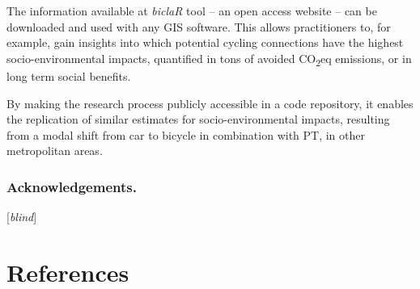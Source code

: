 \documentclass[review, doubleblind, 3p,
authoryear]{elsarticle} %
\begin{document}
The information available at \emph{biclaR} tool -- an open access
website -- can be downloaded and used with any GIS software. This allows
practitioners to, for example, gain insights into which potential
cycling connections have the highest socio-environmental impacts,
quantified in tons of avoided CO\textsubscript{2}eq emissions, or in
long term social benefits.

By making the research process publicly accessible in a code repository,
it enables the replication of similar estimates for socio-environmental
impacts, resulting from a modal shift from car to bicycle in combination
with PT, in other metropolitan areas.

\hypertarget{acknowledgements.}{%
\subsubsection*{Acknowledgements.}\label{acknowledgements.}}

{[}\emph{blind}{]}

\hypertarget{references}{%
\section*{References}\label{references}}
\end{document}
